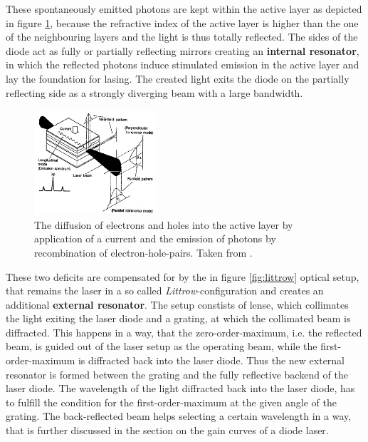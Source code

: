             \FloatBarrier

            These spontaneously emitted photons are kept within the active layer as depicted in figure \ref{fig:diode_laser_scheme}, because the refractive index of the active layer is higher than the one of the 
            neighbouring layers and the light is thus totally reflected. The sides of the diode act as fully or partially reflecting mirrors creating an \textbf{internal resonator}, in which the reflected photons
            induce stimulated emission in the active layer and lay the foundation for lasing. The created light exits the diode on the partially reflecting side as a strongly diverging beam with a large bandwidth.  

             \begin{figure}[h]
                \centering
                \includegraphics[width = 0.4\textwidth]{pictures/diode_laser_scheme.png}
                \caption{The diffusion of electrons and holes into the active layer by application of a current and the emission of photons by recombination of electron-hole-pairs. Taken from \cite{tu_dortmund_versuchsanleitung_2022-1}.}
                \label{fig:diode_laser_scheme}
             \end{figure}
         
             \FloatBarrier

            These two deficits are compensated for by the in figure \ref{fig:littrow} optical setup, that remains the laser in a so called \textit{Littrow}-configuration and creates an additional 
            \textbf{external resonator}. The setup constists of lense, which collimates the light exiting the laser diode and a grating, at which the collimated beam is diffracted. This happens in a way, that
            the zero-order-maximum, i.e. the reflected beam, is guided out of the laser setup as the operating beam, while the first-order-maximum is diffracted back into the laser diode. Thus the new 
            external resonator is formed between the grating and the fully reflective backend of the laser diode. The wavelength of
            the light diffracted back into the laser diode, has to fulfill the condition for the first-order-maximum at the given angle of the grating. The back-reflected beam helps selecting a certain
            wavelength in a way, that is further discussed in the section on the gain curves of a diode laser.   


